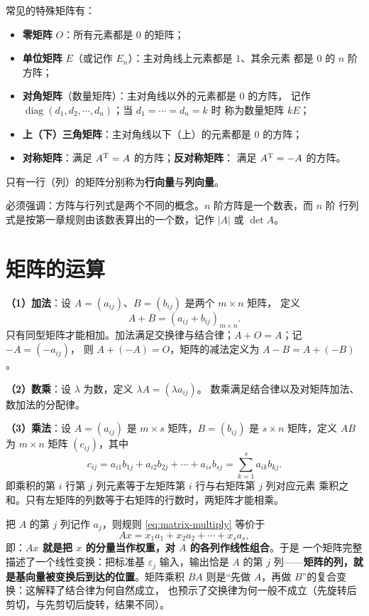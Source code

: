 常见的特殊矩阵有：
\begin{itemize}[itemsep=1pt]
  \item \textbf{零矩阵} $O$：所有元素都是 $0$ 的矩阵；
  \item \textbf{单位矩阵} $E$（或记作 $E_n$）：主对角线上元素都是 $1$、其余元素
        都是 $0$ 的 $n$ 阶方阵；
  \item \textbf{对角矩阵}（数量矩阵）：主对角线以外的元素都是 $0$ 的方阵，
        记作 $\operatorname{diag}(d_1,d_2,\cdots,d_n)$；当 $d_1=\cdots=d_n=k$ 时
        称为数量矩阵 $kE$；
  \item \textbf{上（下）三角矩阵}：主对角线以下（上）的元素都是 $0$ 的方阵；
  \item \textbf{对称矩阵}：满足 $A^{\mathrm{T}}=A$ 的方阵；\textbf{反对称矩阵}：
        满足 $A^{\mathrm{T}}=-A$ 的方阵。
\end{itemize}

只有一行（列）的矩阵分别称为\textbf{行向量}与\textbf{列向量}。

必须强调：方阵与行列式是两个不同的概念。$n$ 阶方阵是一个数表，而 $n$ 阶
行列式是按第一章规则由该数表算出的一个数，记作 $|A|$ 或 $\det A$。

\section{矩阵的运算}\label{sec:matrix-ops}

\textbf{（1）加法}：设 $A=(a_{ij})$、$B=(b_{ij})$ 是两个 $m\times n$ 矩阵，
定义
\[
  A+B=(a_{ij}+b_{ij})_{m\times n}.
\]
只有同型矩阵才能相加。加法满足交换律与结合律；$A+O=A$；记 $-A=(-a_{ij})$，
则 $A+(-A)=O$，矩阵的减法定义为 $A-B=A+(-B)$。

\textbf{（2）数乘}：设 $\lambda$ 为数，定义 $\lambda A=(\lambda a_{ij})$。
数乘满足结合律以及对矩阵加法、数加法的分配律。

\textbf{（3）乘法}：设 $A=(a_{ij})$ 是 $m\times s$ 矩阵，$B=(b_{ij})$ 是
$s\times n$ 矩阵，定义 $AB$ 为 $m\times n$ 矩阵 $(c_{ij})$，其中
\begin{equation}\label{eq:matrix-multiply}
  c_{ij}=a_{i1}b_{1j}+a_{i2}b_{2j}+\cdots+a_{is}b_{sj}
        =\sum_{k=1}^{s}a_{ik}b_{kj}.
\end{equation}
即乘积的第 $i$ 行第 $j$ 列元素等于左矩阵第 $i$ 行与右矩阵第 $j$ 列对应元素
乘积之和。只有左矩阵的列数等于右矩阵的行数时，两矩阵才能相乘。

\begin{insight}
把 $A$ 的第 $j$ 列记作 $a_j$，则规则 \eqref{eq:matrix-multiply} 等价于
\[
  Ax=x_1a_1+x_2a_2+\cdots+x_sa_s ,
\]
即：\textbf{$Ax$ 就是把 $x$ 的分量当作权重，对 $A$ 的各列作线性组合}。于是
一个矩阵完整描述了一个线性变换：把标准基 $\varepsilon_j$ 输入，输出恰是 $A$
的第 $j$ 列——\textbf{矩阵的列，就是基向量被变换后到达的位置}。矩阵乘积
$BA$ 则是“先做 $A$，再做 $B$”的复合变换：这解释了结合律为何自然成立，
也预示了交换律为何一般不成立（先旋转后剪切，与先剪切后旋转，结果不同）。
\end{insight}

